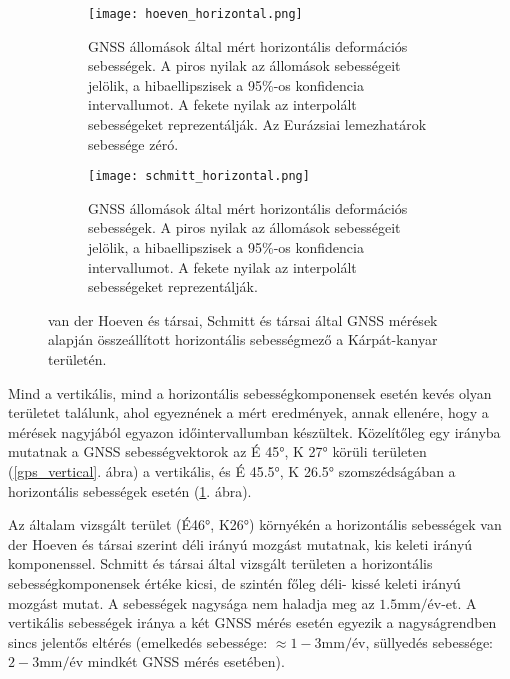\documentclass[12pt]{report}
\numberwithin{equation}{section}
\numberwithin{table}{section}
\numberwithin{figure}{section}
\begin{document}
\begin{center}
    \begin{figure}[H]
        \begin{subfigure}[t]{.4\linewidth}
            \centering
            \texttt{[image: hoeven\_horizontal.png]}
            \caption{GNSS állomások által mért horizontális deformációs sebességek. A piros nyilak az állomások sebességeit jelölik, a hibaellipszisek a 95\%-os konfidencia intervallumot. A fekete nyilak az interpolált sebességeket reprezentálják. Az Eurázsiai lemezhatárok sebessége zéró. \cite{Hoeven2005}}
        \end{subfigure}
        \hspace{25pt}
        \begin{subfigure}[t]{.4\linewidth}
            \centering
            \texttt{[image: schmitt\_horizontal.png]}
            \caption{GNSS állomások által mért horizontális deformációs sebességek. A piros nyilak az állomások sebességeit jelölik, a hibaellipszisek a 95\%-os konfidencia intervallumot. A fekete nyilak az interpolált sebességeket reprezentálják. \cite{Schmitt2007}}
        \end{subfigure}
        \caption{van der Hoeven és társai, Schmitt és társai \cite{Hoeven2005, Schmitt2007} által GNSS mérések alapján összeállított horizontális sebességmező a Kárpát-kanyar területén.}\label{gps_horizontal}
    \end{figure}
\end{center}

Mind a vertikális, mind a horizontális sebességkomponensek esetén kevés olyan területet találunk, ahol egyeznének a mért eredmények, annak ellenére, hogy a mérések nagyjából egyazon időintervallumban készültek. Közelítőleg egy irányba mutatnak a GNSS sebességvektorok az É \ang{45}, K \ang{27} körüli területen (\ref{gps_vertical}. ábra) a vertikális, és É \ang{45.5}, K \ang{26.5} szomszédságában a horizontális sebességek esetén (\ref{gps_horizontal}. ábra).

Az általam vizsgált terület (É\ang{46}, K\ang{26}) környékén a horizontális sebességek van der Hoeven és társai \cite{Hoeven2005} szerint déli irányú mozgást mutatnak, kis keleti irányú komponenssel. Schmitt és társai \cite{Schmitt2007} által vizsgált területen a horizontális sebességkomponensek értéke kicsi, de szintén főleg déli- kissé keleti irányú mozgást mutat. A sebességek nagysága nem haladja meg az $1.5 \text{mm}/\text{év}$-et. A vertikális sebességek iránya a két GNSS mérés esetén egyezik a nagyságrendben sincs jelentős eltérés (emelkedés sebessége: $\approx 1-3 \text{mm}/\text{év}$, süllyedés sebessége: $2-3 \text{mm}/\text{év}$ mindkét GNSS mérés esetében).
\end{document}
